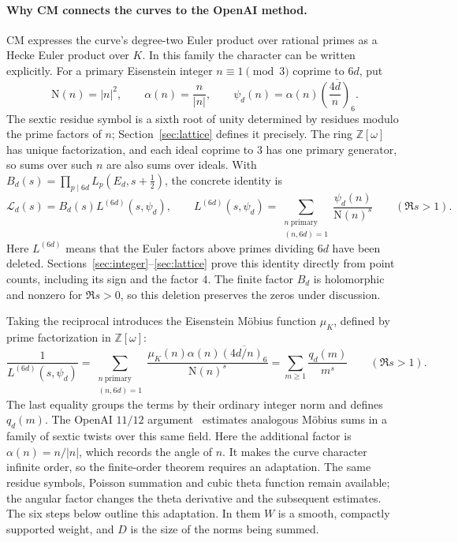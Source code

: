 \documentclass[11pt]{article}
\numberwithin{equation}{section}
\newcommand{\OO}{\mathbb Z[\omega]}
\newcommand{\N}{\mathrm N}
\newcommand{\muk}{\mu_K}
\begin{document}
\paragraph{Why CM connects the curves to the OpenAI method.}
CM expresses the curve's degree-two Euler product over rational primes as a Hecke Euler product over
$K$. In this family the character can be written explicitly. For a primary Eisenstein integer
$n\equiv1\pmod3$ coprime to $6d$, put
\begin{equation}\label{eq:intro-psi}
 \N(n)=|n|^2,\qquad \alpha(n)=\frac n{|n|},\qquad
 \psi_d(n)=\alpha(n)\overline{\left(\frac{4d}{n}\right)_6}.
\end{equation}
The sextic residue symbol is a sixth root of unity determined by residues modulo the prime factors of
$n$; Section~\ref{sec:lattice} defines it precisely. The ring $\OO$ has unique factorization, and each
ideal coprime to $3$ has one primary generator, so sums over such $n$ are also sums over ideals. With
$B_d(s)=\prod_{p\mid6d}L_p(E_d,s+\frac12)$, the concrete identity is
\begin{equation}\label{eq:intro-hecke}
 \mathcal L_d(s)=B_d(s)L^{(6d)}(s,\psi_d),\qquad
 L^{(6d)}(s,\psi_d)=
 \sum_{\substack{n\ \mathrm{primary}\\(n,6d)=1}}
 \frac{\psi_d(n)}{\N(n)^s}\qquad(\Re s>1).
\end{equation}
Here $L^{(6d)}$ means that the Euler factors above primes dividing $6d$ have been deleted.
Sections~\ref{sec:integer}--\ref{sec:lattice} prove this identity directly from point counts, including its
sign and the factor $4$. The finite factor $B_d$ is holomorphic and nonzero for $\Re s>0$, so this
deletion preserves the zeros under discussion.

Taking the reciprocal introduces the Eisenstein M\"obius function $\muk$, defined by prime
factorization in $\OO$:
\begin{equation}\label{eq:intro-inverse}
 \frac1{L^{(6d)}(s,\psi_d)}=
 \sum_{\substack{n\ \mathrm{primary}\\(n,6d)=1}}
 \frac{\muk(n)\alpha(n)\overline{(4d/n)_6}}{\N(n)^s}
 =\sum_{m\ge1}\frac{q_d(m)}{m^s}\qquad(\Re s>1).
\end{equation}
The last equality groups the terms by their ordinary integer norm and defines $q_d(m)$.
The OpenAI $11/12$ argument~\cite{OAI1112} estimates analogous M\"obius sums in a family of sextic twists
over this same field. Here the additional factor is $\alpha(n)=n/|n|$, which records the angle of $n$.
It makes the curve character infinite order, so the finite-order theorem requires an adaptation.
The same residue symbols, Poisson summation and cubic theta function remain available; the angular
factor changes the theta derivative and the subsequent estimates. The six steps below outline this
adaptation. In them $W$ is a smooth, compactly supported weight, and $D$ is the size of the norms being summed.
\end{document}
